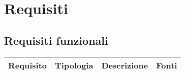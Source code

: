\section{Requisiti }

\subsection{Requisiti funzionali }

      \begin{center}
      \begin{longtable}{ | p{2cm} | p{2cm} | p{5cm} | p{2cm} |}
    
      \cellcolor[gray]{0.9} \textbf{Requisito} & \cellcolor[gray]{0.9} \textbf{Tipologia} 
      & \cellcolor[gray]{0.9} \textbf{Descrizione} & \cellcolor[gray]{0.9} \textbf{Fonti} \\ \hline
      

\end{longtable}
\end{center}
